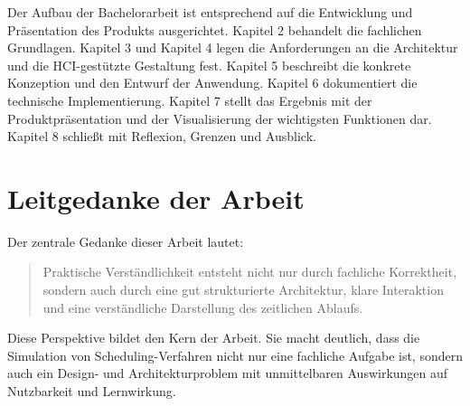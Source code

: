 Der Aufbau der Bachelorarbeit ist entsprechend auf die Entwicklung und Präsentation des Produkts ausgerichtet. Kapitel 2 behandelt die fachlichen Grundlagen. Kapitel 3 und Kapitel 4 legen die Anforderungen an die Architektur und die HCI-gestützte Gestaltung fest. Kapitel 5 beschreibt die konkrete Konzeption und den Entwurf der Anwendung. Kapitel 6 dokumentiert die technische Implementierung. Kapitel 7 stellt das Ergebnis mit der Produktpräsentation und der Visualisierung der wichtigsten Funktionen dar. Kapitel 8 schließt mit Reflexion, Grenzen und Ausblick.

\section{Leitgedanke der Arbeit}

Der zentrale Gedanke dieser Arbeit lautet:

\begin{quote}
    Praktische Verständlichkeit entsteht nicht nur durch fachliche Korrektheit, sondern auch durch eine gut strukturierte Architektur, klare Interaktion und eine verständliche Darstellung des zeitlichen Ablaufs.
\end{quote}

Diese Perspektive bildet den Kern der Arbeit. Sie macht deutlich, dass die Simulation von Scheduling-Verfahren nicht nur eine fachliche Aufgabe ist, sondern auch ein Design- und Architekturproblem mit unmittelbaren Auswirkungen auf Nutzbarkeit und Lernwirkung.
